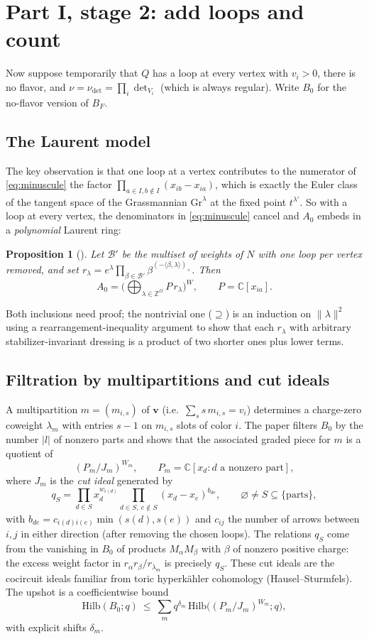 \documentclass[11pt]{amsart}
\newtheorem{proposition}[theorem]{Proposition}
\theoremstyle{remark}
\newcommand{\C}{\mathbb{C}}
\newcommand{\Z}{\mathbb{Z}}
\newcommand{\Gr}{\mathrm{Gr}}
\newcommand{\Hilb}{\mathrm{Hilb}}
\newcommand{\bv}{\mathbf{v}}
\begin{document}
\section{Part I, stage 2: add loops and count}

Now suppose temporarily that $Q$ has a loop at every vertex with $v_i>0$,
there is no flavor, and $\nu=\nu_{\det}=\prod_i\det_{V_i}$ (which is always
regular).  Write $B_0$ for the no-flavor version of $B_F$.

\subsection{The Laurent model}  The key observation is that one loop at a
vertex contributes to the numerator of \eqref{eq:minuscule} the factor
$\prod_{a\in I,b\notin I}(x_{ib}-x_{ia})$, which is exactly the Euler class
of the tangent space of the Grassmannian $\Gr^{\lambda}$ at the fixed point
$t^{\lambda'}$.  So with a loop at every vertex, the denominators in
\eqref{eq:minuscule} cancel and $A_0$ embeds in a \emph{polynomial} Laurent
ring:
\begin{proposition}[{\cite[Prop.~5.1]{OAI-Hikita}}]
Let $\mathcal B'$ be the multiset of weights of $N$ with one loop per vertex
removed, and set $r_\lambda=e^\lambda\prod_{\beta\in\mathcal B'}\beta^{(-\langle\beta,\lambda\rangle)_+}$.
Then
\[
 A_0=\Big(\bigoplus_{\lambda\in\Z^{\Omega}}P\,r_\lambda\Big)^{W},
 \qquad P=\C[x_{ia}].
\]
\end{proposition}
Both inclusions need proof; the nontrivial one ($\supseteq$) is an
induction on $\|\lambda\|^2$ using a rearrangement-inequality argument to
show that each $r_\lambda$ with arbitrary stabilizer-invariant dressing is
a product of two shorter ones plus lower terms.

\subsection{Filtration by multipartitions and cut ideals}
A multipartition $m=(m_{i,s})$ of $\bv$ (i.e.\ $\sum_s s\,m_{i,s}=v_i$)
determines a charge-zero coweight $\lambda_m$ with entries $s-1$ on
$m_{i,s}$ slots of color $i$.  The paper filters $B_0$ by the number $|l|$
of nonzero parts and shows that the associated graded piece for $m$ is a
quotient of
\[
 (P_m/J_m)^{W_m},\qquad P_m=\C[x_d: d\text{ a nonzero part}],
\]
where $J_m$ is the \emph{cut ideal} generated by
\[
 q_S=\prod_{d\in S}x_d^{w_{i(d)}}\prod_{d\in S,\ e\notin S}(x_d-x_e)^{b_{de}},
 \qquad \varnothing\neq S\subseteq\{\text{parts}\},
\]
with $b_{de}=c_{i(d)i(e)}\min(s(d),s(e))$ and $c_{ij}$ the number of arrows between $i,j$ in either direction (after removing the chosen loops).
The relations $q_S$ come from the vanishing in $B_0$ of products
$M_\alpha M_\beta$ with $\beta$ of nonzero positive charge: the excess
weight factor in $r_\alpha r_\beta/r_{\lambda_m}$ is precisely $q_S$.
These cut ideals are the cocircuit ideals familiar from toric hyperk\"ahler
cohomology (Hausel--Sturmfels).  The upshot is a coefficientwise bound
\begin{equation}\label{eq:bound}
 \Hilb(B_0;q)\ \le\ \sum_{m}q^{\delta_m}\,\Hilb\big((P_m/J_m)^{W_m};q\big),
\end{equation}
with explicit shifts $\delta_m$.
\end{document}
